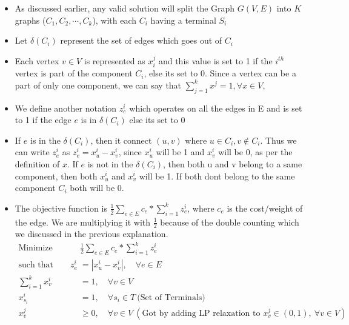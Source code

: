 \documentclass[11pt]{article}
\begin{document}
\begin{itemize} \itemsep -3pt
    \item As discussed earlier, any valid solution will split the Graph $G(V,E)$ into $K$ graphs ($C_1, C_2,\cdots,C_k$), with each $C_i$ having a terminal $S_i$
    \item Let $\delta(C_i)$ represent the set of edges which goes out of $C_i$
    \item Each vertex $v \in V$ is represented as $x_i^j$ and this value is set to 1 if the $i^{th}$ vertex is part of the component $C_i$, else its set to 0. Since a vertex can be a part of only one component, we can say that $\sum\limits_{j=1}^{k}{x^j} = 1, \forall x \in V$, 
    \item We define another notation $z_e^i$ which operates on all the edges in E and is set to 1 if the edge $e$ is in $\delta(C_i)$ else its set to 0
    \item If $e$ is in the $\delta(C_i)$, then it connect $(u,v)$ where $u \in C_i, v \notin C_i$. Thus we can write $z_e^i$ as $z_e^i = x_u^i - x_v^i$, since $x_u^i$ will be 1 and $x_v^i$ will be 0, as per the definition of $x$. If $e$ is not in the $\delta(C_i)$, then both u and v belong to a same component, then both $x_u^i$ and $x_v^i$ will be 1. If both dont belong to the same component $C_i$ both will be 0.
    \item The objective function is $\frac{1}{2}\sum\limits_{e \in E}{c_e * \sum\limits_{i=1}^{k}{z_e^i}}$, where $c_e$ is the cost/weight of the edge. We are multiplying it with $\frac{1}{2}$ because of the double counting which we discussed in the previous explanation.
\begin{align*}
\text{Minimize} \qquad & \frac{1}{2}\sum\limits_{e \in E}{c_e * \sum\limits_{i=1}^{k}{z_e^i}}\\
\text{such that}  \qquad z_e^i &= |x_u^i - x_v^i|, \quad \forall e \in E\\
\sum\limits_{i=1}^{k}{x_v^i} &= 1,\quad \forall v \in V\\
x_{s_i}^i &= 1,\quad \forall s_i \in T \ \text{(Set of Terminals)}\\
x_v^j &\ge 0, \quad \forall v \in V \ (\text{Got by adding LP relaxation to }x_v^j \in (0,1),\ \forall v \in V)
\end{align*}
\end{itemize}
\end{document}
